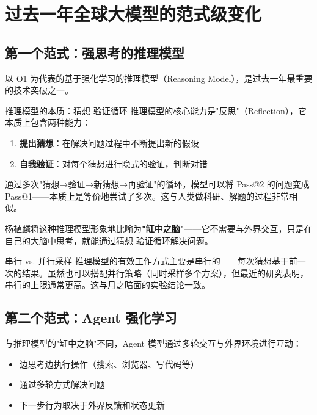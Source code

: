 \section{过去一年全球大模型的范式级变化}

\subsection{第一个范式：强思考的推理模型}

以 O1 为代表的基于强化学习的推理模型（Reasoning Model），是过去一年最重要的技术突破之一。

\begin{importantbox}{推理模型的本质：猜想-验证循环}
推理模型的核心能力是"反思"（Reflection），它本质上包含两种能力：
\begin{enumerate}
    \item \textbf{提出猜想}：在解决问题过程中不断提出新的假设
    \item \textbf{自我验证}：对每个猜想进行隐式的验证，判断对错
\end{enumerate}
通过多次"猜想→验证→新猜想→再验证"的循环，模型可以将 Pass@2 的问题变成 Pass@1——本质上是等价地尝试了多次。这与人类做科研、解题的过程非常相似。
\end{importantbox}

杨植麟将这种推理模型形象地比喻为\textbf{"缸中之脑"}——它不需要与外界交互，只是在自己的大脑中思考，就能通过猜想-验证循环解决问题。

\begin{knowledgebox}{串行 vs. 并行采样}
推理模型的有效工作方式主要是串行的——每次猜想基于前一次的结果。虽然也可以搭配并行策略（同时采样多个方案），但最近的研究表明，串行的上限通常更高。这与月之暗面的实验结论一致。
\end{knowledgebox}

\subsection{第二个范式：Agent 强化学习}

与推理模型的"缸中之脑"不同，Agent 模型通过多轮交互与外界环境进行互动：

\begin{itemize}
    \item 边思考边执行操作（搜索、浏览器、写代码等）
    \item 通过多轮方式解决问题
    \item 下一步行为取决于外界反馈和状态更新
\end{itemize}

